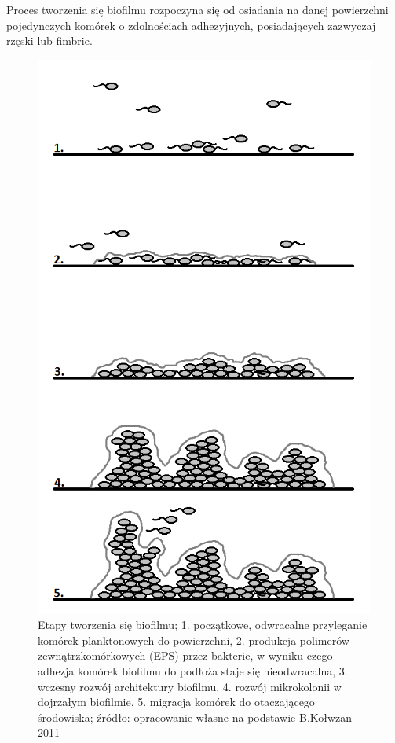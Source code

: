 \documentclass[11pt,a4paper]{report}
\begin{document}
Proces tworzenia się biofilmu rozpoczyna się od osiadania na danej powierzchni pojedynczych komórek o zdolnościach adhezyjnych, posiadających zazwyczaj rzęski lub fimbrie\cite{myszka, kolwzan}. 

\clearpage
\begin{figure}[!h]

\begin{center}
\includegraphics[scale=0.68]{img/biofilm.png}
\caption{Etapy tworzenia się biofilmu;
1. początkowe, odwracalne przyleganie komórek planktonowych do powierzchni,
2. produkcja polimerów zewnątrzkomórkowych (EPS) przez bakterie, w wyniku czego adhezja komórek biofilmu do podłoża staje się nieodwracalna,
3. wczesny rozwój architektury biofilmu,
4. rozwój mikrokolonii w dojrzałym biofilmie, 
5. migracja komórek do otaczającego środowiska;
źródło: opracowanie własne na podstawie B.Kołwzan 2011\cite{kolwzan}}\label{biofilm}
\end{center} 
\end{figure}
\clearpage
\end{document}
